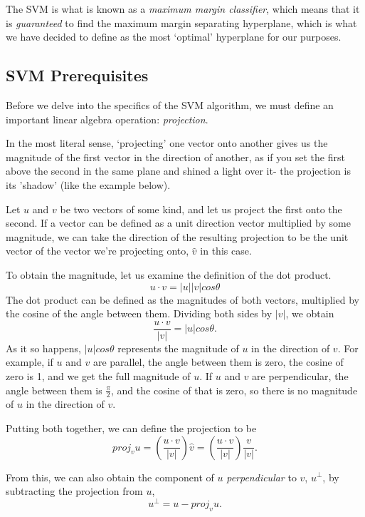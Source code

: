 The SVM is what is known as a \textit{maximum margin classifier}, which means that it is \textit{guaranteed} to find the maximum margin separating hyperplane, which is what we have decided to define as the most `optimal' hyperplane for our purposes.

\subsection{SVM Prerequisites}
Before we delve into the specifics of the SVM algorithm, we must define an important linear algebra operation: \textit{projection}.

In the most literal sense, `projecting' one vector onto another gives us the magnitude of the first vector in the direction of another, as if you set the first above the second in the same plane and shined a light over it- the projection is its 'shadow' (like the example below).


Let $u$ and $v$ be two vectors of some kind, and let us project the first onto the second. If a vector can be defined as a unit direction vector multiplied by some magnitude, we can take the direction of the resulting projection to be the unit vector of the vector we're projecting onto, $\hat{v}$ in this case.

To obtain the magnitude, let us examine the definition of the dot product.
\[
    u \cdot v = |u||v|cos\theta
\]
The dot product can be defined as the magnitudes of both vectors, multiplied by the cosine of the angle between them. Dividing both sides by $|v|$, we obtain
\[
    \frac{u \cdot v}{|v|} = |u|cos\theta.
\]
As it so happens, $|u|cos\theta$ represents the magnitude of $u$ in the direction of $v$. For example, if $u$ and $v$ are parallel, the angle between them is zero, the cosine of zero is 1, and we get the full magnitude of $u$. If $u$ and $v$ are perpendicular, the angle between them is $\frac{\pi}{2}$, and the cosine of that is zero, so there is no magnitude of $u$ in the direction of $v$.

Putting both together, we can define the projection to be
\[
    proj_vu = (\frac{u \cdot v}{|v|})\hat{v} = (\frac{u \cdot v}{|v|})\frac{v}{|v|}.
\]

From this, we can also obtain the component of $u$ \textit{perpendicular} to $v$, $u^\perp$, by subtracting the projection from $u$,
\[
    u^\perp = u - proj_vu.
\]

